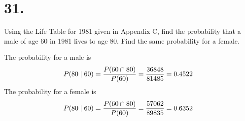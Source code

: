 \section*{31.}
Using the Life Table for 1981 given in Appendix C, find the probability that a
male of age 60 in 1981 lives to age 80. Find the same probability for a female.

\bigskip
\noindent
The probability for a male is
$$P(80\mid60)={P(60\cap 80)\over P(60)}={36848\over81485}=0.4522$$
The probability for a female is
$$P(80\mid60)={P(60\cap 80)\over P(60)}={57062\over89835}=0.6352$$
